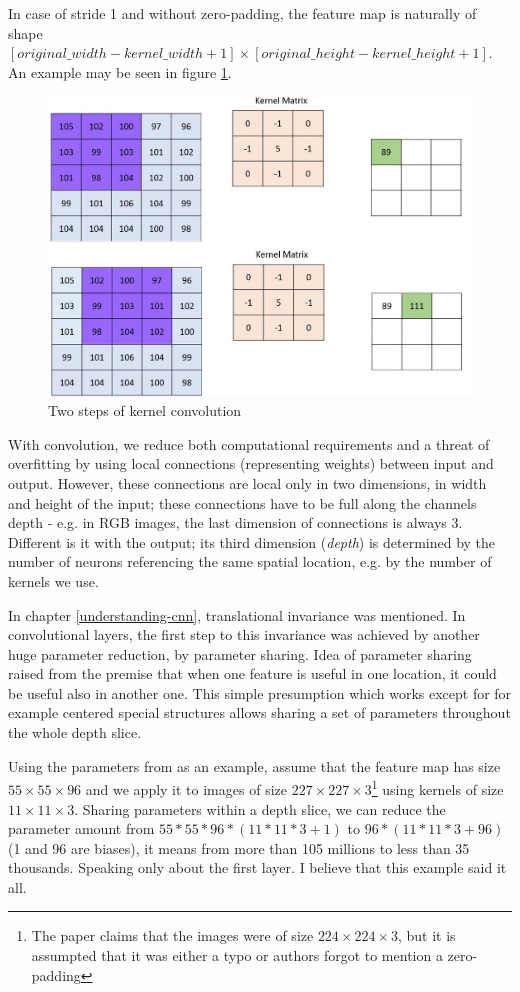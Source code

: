 In case of stride 1 and without zero-padding, the feature map is naturally of 
shape $[original\_width - kernel\_width + 1] \times [original\_height - 
kernel\_height + 1]$. An example may be seen in figure \ref{fig:conv}. 

\begin{figure}[H]
   \centering
	\includegraphics[width=.4\linewidth]{./pictures/conv.jpg}
	\caption[Kernel convolution]{Two steps of kernel convolution}
      \label{fig:conv}
\end{figure}

With convolution, we reduce both computational requirements and a threat of 
overfitting by using local connections (representing weights) between input and 
output. However, these connections are local only in two dimensions, in width 
and height of the input; these connections have to be full along the channels 
depth - e.g. in RGB images, the last dimension of connections is always 3. 
Different is it with the output; its third dimension (\textit{depth}) is 
determined by the number of neurons referencing the same spatial location, e.g. 
by the number of kernels we use. 

In chapter \ref{understanding-cnn}, translational invariance was mentioned. In 
convolutional layers, the first step to this invariance was achieved by another 
huge parameter reduction, by parameter sharing. Idea of parameter sharing raised 
from the premise that when one feature is useful in one location, it could be
useful also in another one. This simple presumption which works except for for 
example centered special structures allows sharing a set of parameters 
throughout the whole depth slice. 

Using the parameters from \cite{cnn-classification} as an example, assume that 
the feature map has size $55 \times 55 \times 96$ and we apply it to images of 
size $227 \times 227 \times 3$\footnote{The paper claims that the images were of 
size $224 \times 224 \times 3$, but it is assumpted that it was either a typo or 
authors forgot to mention a zero-padding} using kernels of size $11 \times 11 
\times 3$. Sharing parameters within a depth slice, we can reduce the parameter 
amount from $55 * 55 * 96 * (11 * 11 * 3 + 1)$ to $96 * (11 * 11 * 3 + 96)$ (1 
and 96 are biases), it means from more than 105 millions to less than 35 
thousands. Speaking only about the first layer. I believe that this example said 
it all. 

